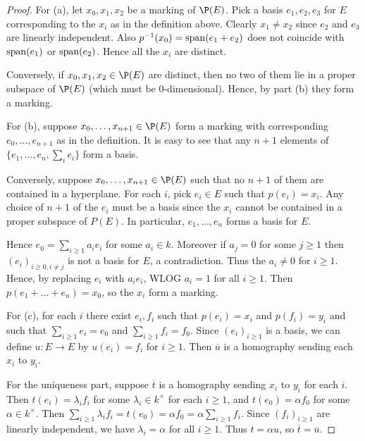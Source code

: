 \documentclass{article}
\begin{document}
\begin{proof}
For (a), let $x_0, x_1, x_2$ be a marking of $\P(E)$.  Pick a basis $e_1, e_2, e_3$ for $E$ corresponding to the $x_i$ as in the definition above.  Clearly $x_1 \neq x_2$ since $e_2$ and $e_3$ are linearly independent.  Also $p^{-1}(x_0) = \operatorname{span}(e_1 + e_2)$ does not coincide with $\operatorname{span}(e_1)$ or $\operatorname{span}(e_2)$.  Hence all the $x_i$ are distinct.

Conversely, if $x_0, x_1, x_2 \in \P(E)$ are distinct, then no two of them lie in a proper subspace of $\P(E)$ (which must be 0-dimensional). Hence, by part (b) they form a marking.

For (b), suppose $x_0, \ldots, x_{n+1} \in \P(E)$ form a marking with corresponding $e_0, \ldots, e_{n+1}$ as in the definition. It is easy to see that any $n+1$ elements of $\{e_1, \ldots, e_n, \sum_i e_i \}$ form a basis. 

Conversely, suppose $x_0, \ldots, x_{n+1} \in \P(E)$ such that no $n+1$ of them are contained in a hyperplane.  For each $i$, pick $e_i \in E$ such that $p(e_i) = x_i$. Any choice of $n+1$ of the $e_i$ must be a basis since the $x_i$ cannot be contained in a proper subspace of $P(E)$.  In particular, $e_1, \ldots, e_n$ forms a basis for $E$.  

Hence $e_0 = \sum_{i \ge 1} a_i e_i$ for some $a_i \in k$.  Moreover if $a_j = 0$ for some $j \ge 1$ then $(e_i)_{i \ge 0, i \neq j}$ is not a basis for $E$, a contradiction.  Thus the $a_i \neq 0$ for $i \ge 1$.  Hence, by replacing $e_i$ with $a_i e_i$, WLOG $a_i = 1$ for all $i \ge 1$.  Then $p(e_1 + \ldots + e_n) = x_0$, so the $x_i$ form a marking.

For (c), for each $i$ there exist $e_i, f_i$ such that $p(e_i) = x_i$ and $p(f_i) = y_i$ and such that $\sum_{i \ge 1} e_i = e_0$ and $\sum_{i \ge 1} f_i = f_0$.
Since $(e_i)_{i \ge 1}$ is a basis, we can define $u:E \to E$ by $u(e_i) = f_i$ for $i \ge 1$.  Then $\overline u$ is a homography sending each $x_i$ to $y_i$.

For the uniqueness part, suppose $\overline t$ is a homography sending $x_i$ to $y_i$ for each $i$.  Then $t(e_i) = \lambda_i f_i$ for some $\lambda_i \in k^\times$ for each $i \ge 1$, and $t(e_0) = \alpha f_0$ for some $\alpha \in k^\times$.  Then $\sum_{i \ge 1} \lambda_i f_i = t(e_0) = \alpha f_0 = \alpha \sum_{i \ge 1} f_i$. Since $(f_i)_{i \ge 1}$ are linearly independent, we have $\lambda_i = \alpha$ for all $i \ge 1$. Thus $t = \alpha u$, so $\overline t = \overline u$.
\end{proof}
\end{document}
